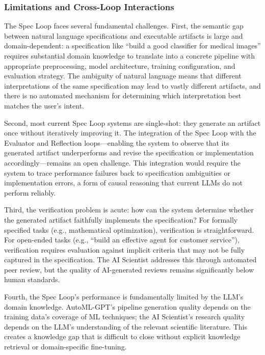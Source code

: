\subsubsection{Limitations and Cross-Loop Interactions}

The Spec Loop faces several fundamental challenges. First, the semantic gap between natural language specifications and executable artifacts is large and domain-dependent: a specification like ``build a good classifier for medical images'' requires substantial domain knowledge to translate into a concrete pipeline with appropriate preprocessing, model architecture, training configuration, and evaluation strategy. The ambiguity of natural language means that different interpretations of the same specification may lead to vastly different artifacts, and there is no automated mechanism for determining which interpretation best matches the user's intent.

Second, most current Spec Loop systems are single-shot: they generate an artifact once without iteratively improving it. The integration of the Spec Loop with the Evaluator and Reflection loops---enabling the system to observe that its generated artifact underperforms and revise the specification or implementation accordingly---remains an open challenge. This integration would require the system to trace performance failures back to specification ambiguities or implementation errors, a form of causal reasoning that current LLMs do not perform reliably.

Third, the verification problem is acute: how can the system determine whether the generated artifact faithfully implements the specification? For formally specified tasks (e.g., mathematical optimization), verification is straightforward. For open-ended tasks (e.g., ``build an effective agent for customer service''), verification requires evaluation against implicit criteria that may not be fully captured in the specification. The AI Scientist addresses this through automated peer review, but the quality of AI-generated reviews remains significantly below human standards.

Fourth, the Spec Loop's performance is fundamentally limited by the LLM's domain knowledge. AutoML-GPT's pipeline generation quality depends on the training data's coverage of ML techniques; the AI Scientist's research quality depends on the LLM's understanding of the relevant scientific literature. This creates a knowledge gap that is difficult to close without explicit knowledge retrieval or domain-specific fine-tuning.

